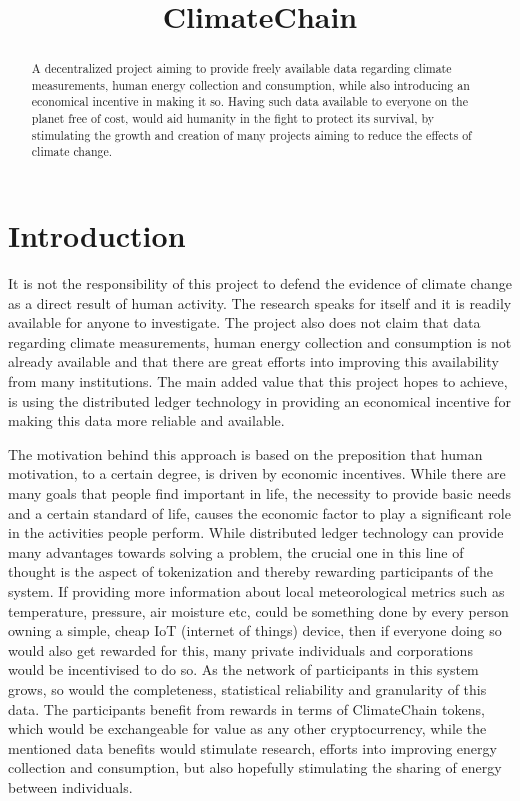 \documentclass[]{article}
\title{}
\author{}
\begin{document}
\title{ClimateChain}
\maketitle

\begin{abstract}
A decentralized project aiming to provide freely available data regarding climate measurements, human energy collection and consumption, while also introducing an economical incentive in making it so. Having such data available to everyone on the planet free of cost, would aid humanity in the fight to protect its survival, by stimulating the growth and creation of many projects aiming to reduce the effects of climate change. 
\end{abstract}

\section{Introduction}
It is not the responsibility of this project to defend the evidence of climate change as a direct result of human activity. The research speaks for itself and it is readily available for anyone to investigate. The project also does not claim that data regarding climate measurements, human energy collection and consumption is not already available and that there are great efforts into improving this availability from many institutions. The main added value that this project hopes to achieve, is using the distributed ledger technology in providing an economical incentive for making this data more reliable and available. 


The motivation behind this approach is based on the preposition that human motivation, to a certain degree, is driven by economic incentives. While there are many goals that people find important in life, the necessity to provide basic needs and a certain standard of life, causes the economic factor to play a significant role in the activities people perform. While distributed ledger technology can provide many advantages towards solving a problem, the crucial one in this line of thought is the aspect of tokenization and thereby rewarding participants of the system. If providing more information about local meteorological metrics such as temperature, pressure, air moisture etc, could be something done by every person owning a simple, cheap IoT (internet of things) device, then if everyone doing so would also get rewarded for this, many private individuals and corporations would be incentivised  to do so. As the network of participants in this system grows, so would the completeness, statistical reliability and granularity of this data. The participants benefit from rewards in terms of ClimateChain tokens, which would be exchangeable for value as any other cryptocurrency, while the mentioned data benefits would stimulate research, efforts into improving energy collection and consumption, but also hopefully stimulating the sharing of energy between individuals.
\end{document}
